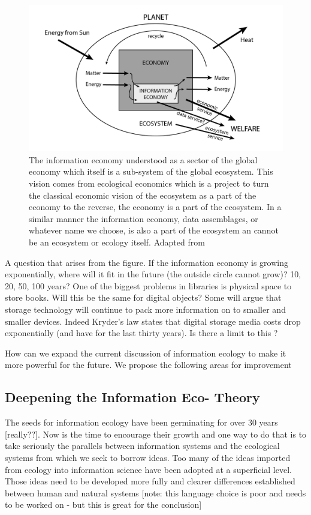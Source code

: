 \begin{figure}[!ht]
  \centering
    \includegraphics[width=5.5in]{figures/ecologicalecon}
  \caption{The information economy understood as a sector of the global economy which itself is a sub-system of the global ecosystem. This vision comes from ecological economics which is a project to turn the classical economic vision of the ecosystem as a part of the economy to the reverse, the economy is a part of the ecosystem. In a similar manner the information economy, data assemblages, or whatever name we choose, is also a part of the ecosystem an cannot be an ecosystem or ecology itself. Adapted from \citep[][p. 18]{daly_2004}}
\end{figure}

A question that arises from the figure. If the information economy is growing exponentially, where will it fit in the future (the outside circle cannot grow)? 10, 20, 50, 100 years? One of the biggest problems in libraries is physical space to store books. Will this be the same for digital objects? Some will argue that storage technology will continue to pack more information on to smaller and smaller devices. Indeed Kryder's law states that digital storage media costs drop exponentially (and have for the last thirty years). Is there a limit to this \citep[cf.][]{rosenthal_2012}?
 
How can we expand the current discussion of information ecology to make it more powerful for the future. We propose the following areas for improvement

\subsection{Deepening the Information Eco- Theory}

The seeds for information ecology have been germinating for over 30 years [really??]. Now is the time to encourage their growth and one way to do that is to take seriously the parallels between information systems and the ecological systems from which we seek to borrow ideas. Too many of the ideas imported from ecology into information science have been adopted at a superficial level. Those ideas need to be developed more fully and clearer differences established between human and natural systems [note: this language choice is poor and needs to be worked on - but this is great for the conclusion]

